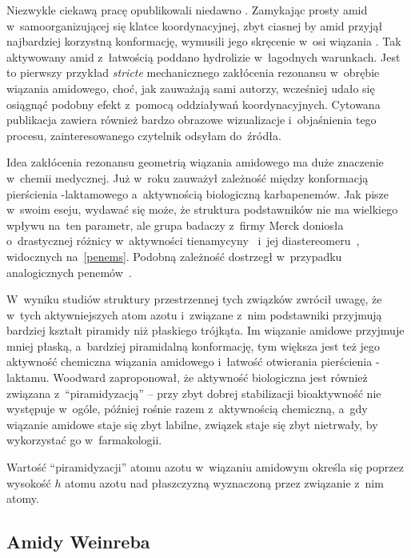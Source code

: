 Niezwykle ciekawą pracę opublikowali niedawno \citeauthor{takezawa20}.
Zamykając prosty amid w~samoorganizującej się klatce koordynacyjnej, zbyt ciasnej by amid przyjął
  najbardziej korzystną konformację, wymusili jego skręcenie w~osi wiązania
  .
Tak aktywowany amid z~łatwością poddano hydrolizie w~łagodnych warunkach.
Jest to pierwszy przykład \textit{stricte} mechanicznego zakłócenia rezonansu w~obrębie wiązania
  amidowego, choć, jak zauważają sami autorzy, wcześniej udało się osiągnąć podobny efekt z~pomocą
  oddziaływań koordynacyjnych.
Cytowana publikacja zawiera również bardzo obrazowe wizualizacje i~objaśnienia tego procesu,
  zainteresowanego czytelnik odsyłam do~źródła.

Idea zakłócenia rezonansu geometrią wiązania amidowego ma duże znaczenie w~chemii medycznej.
Już w~roku \citeyear{woodward80} \citeauthor{woodward80} zauważył zależność między konformacją
  pierścienia \textbeta{}-laktamowego a~aktywnością biologiczną karbapenemów.
Jak pisze w~swoim eseju, wydawać się może, że struktura podstawników
  nie ma wielkiego wpływu na~ten parametr, ale grupa badaczy z~firmy Merck doniosła o~drastycznej
  różnicy w~aktywności tienamycyny~ i~jej
  diastereomeru~, widocznych na~\cref{penems}.
Podobną zależność \citeauthor{woodward80} dostrzegł w~przypadku analogicznych
  penemów~.

W~wyniku studiów struktury przestrzennej tych związków zwrócił uwagę, że w~tych aktywniejszych
  atom azotu i~związane z~nim podstawniki przyjmują bardziej kształt piramidy niż płaskiego
  trójkąta.
Im wiązanie amidowe przyjmuje mniej płaską, a~bardziej piramidalną konformację, tym większa
  jest też jego aktywność chemiczna wiązania amidowego i~łatwość otwierania pierścienia
  \textbeta{}-laktamu.
Woodward zaproponował, że aktywność biologiczna jest również związana z~\enquote{piramidyzacją} \---
  przy zbyt dobrej stabilizacji bioaktywność nie występuje w~ogóle, później rośnie razem
  z~aktywnością chemiczną, a~gdy wiązanie amidowe staje się zbyt labilne, związek staje się
  zbyt nietrwały, by wykorzystać go w~farmakologii.
\begin{marginfigure}
  
  \caption{
    Wartość \enquote{piramidyzacji} atomu azotu w~wiązaniu amidowym określa się poprzez wysokość $h$
      atomu azotu nad płaszczyzną wyznaczoną przez związanie z~nim atomy.
  }
  \label{fig:pyramidization}
\end{marginfigure}


\subsection{Amidy Weinreba}\label{literature:structure:weinreb}

